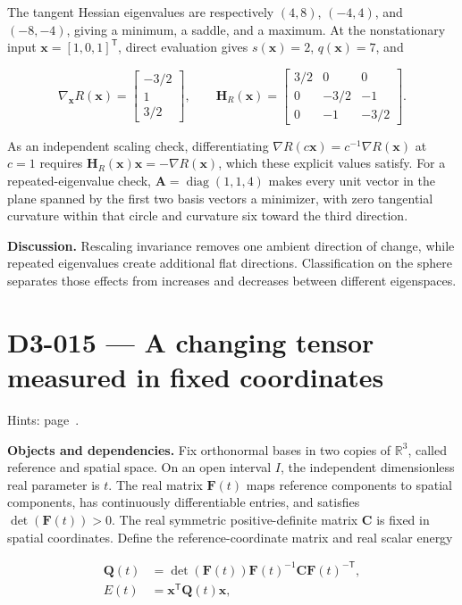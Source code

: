 \documentclass[11pt,oneside,openany]{book}
\begin{document}
The tangent Hessian eigenvalues are respectively \((4,8)\), \((-4,4)\), and \((-8,-4)\), giving a minimum, a saddle, and a maximum. At the nonstationary input \(\mathbf x=[1,0,1]^{\mathsf T}\), direct evaluation gives \(s(\mathbf x)=2\), \(q(\mathbf x)=7\), and

\[
\nabla_{\mathbf x}R(\mathbf x)=\begin{bmatrix}-3/2\\1\\3/2\end{bmatrix},\qquad
\mathbf H_R(\mathbf x)=\begin{bmatrix}3/2&0&0\\0&-3/2&-1\\0&-1&-3/2\end{bmatrix}.
\]

As an independent scaling check, differentiating \(\nabla R(c\mathbf x)=c^{-1}\nabla R(\mathbf x)\) at \(c=1\) requires \(\mathbf H_R(\mathbf x)\mathbf x=-\nabla R(\mathbf x)\), which these explicit values satisfy. For a repeated-eigenvalue check, \(\mathbf A=\operatorname{diag}(1,1,4)\) makes every unit vector in the plane spanned by the first two basis vectors a minimizer, with zero tangential curvature within that circle and curvature six toward the third direction.

\textbf{Discussion.} Rescaling invariance removes one ambient direction of change, while repeated eigenvalues create additional flat directions. Classification on the sphere separates those effects from increases and decreases between different eigenspaces.
\clearpage
\section{D3-015 --- A changing tensor measured in fixed coordinates}
\label{problem:D3-015}
{\small Hints: page~\pageref{hints:D3-015}.}\par\medskip

\textbf{Objects and dependencies.} Fix orthonormal bases in two copies of \(\mathbb R^3\), called reference and spatial space. On an open interval \(I\), the independent dimensionless real parameter is \(t\). The real matrix \(\mathbf F(t)\) maps reference components to spatial components, has continuously differentiable entries, and satisfies \(\det(\mathbf F(t))>0\). The real symmetric positive-definite matrix \(\mathbf C\) is fixed in spatial coordinates. Define the reference-coordinate matrix and real scalar energy

\[
\begin{aligned}
\mathbf Q(t)&=\det(\mathbf F(t))\mathbf F(t)^{-1}\mathbf C\mathbf F(t)^{-\mathsf T},\\
E(t)&=\mathbf x^{\mathsf T}\mathbf Q(t)\mathbf x,
\end{aligned}
\]
\end{document}
